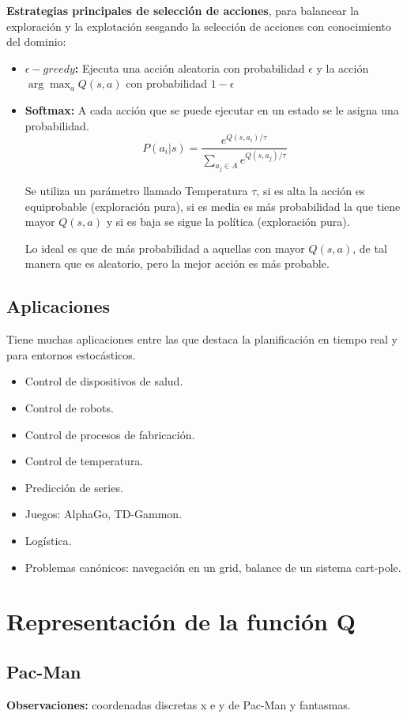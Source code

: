 \documentclass[12pt, twoside, openright]{report} %
\begin{document}
\textbf{Estrategias principales de selección de acciones}, para balancear la exploración y la explotación sesgando la selección de acciones con conocimiento del dominio:
\begin{itemize}
	\item \textbf{$\epsilon-greedy$:} Ejecuta una acción aleatoria con probabilidad $\epsilon$ y la acción $\arg \max_a Q(s, a)$ con probabilidad $1-\epsilon$
	\item \textbf{Softmax:} A cada acción que se puede ejecutar en un estado se le asigna una probabilidad.
	      $$ P(a_i|s)= \frac{e^{Q(s, a_i)/\tau}} {\sum\limits_{a_j \in A} e^{Q(s, a_j)/\tau}} $$

	      Se utiliza un parámetro llamado Temperatura $\tau$, si es alta la acción es equiprobable (exploración pura), si es media es más probabilidad la que tiene mayor $Q(s, a)$ y si es baja se sigue la política (exploración pura).

	      Lo ideal es que de más probabilidad a aquellas con mayor $Q(s, a)$, de tal manera que es aleatorio, pero la mejor acción es más probable.
\end{itemize}

\subsection{Aplicaciones}
Tiene muchas aplicaciones entre las que destaca la planificación en tiempo real y para entornos estocásticos.
\begin{itemize}
	\item Control de dispositivos de salud.
	\item Control de robots.
	\item Control de procesos de fabricación.
	\item Control de temperatura.
	\item Predicción de series.
	\item Juegos: AlphaGo, TD-Gammon.
	\item Logística.
	\item Problemas canónicos: navegación en un grid, balance de un sistema cart-pole.
\end{itemize}

\section{Representación de la función Q}
\subsection{Pac-Man}
\textbf{Observaciones:} coordenadas discretas x e y de Pac-Man y fantasmas.
\end{document}
